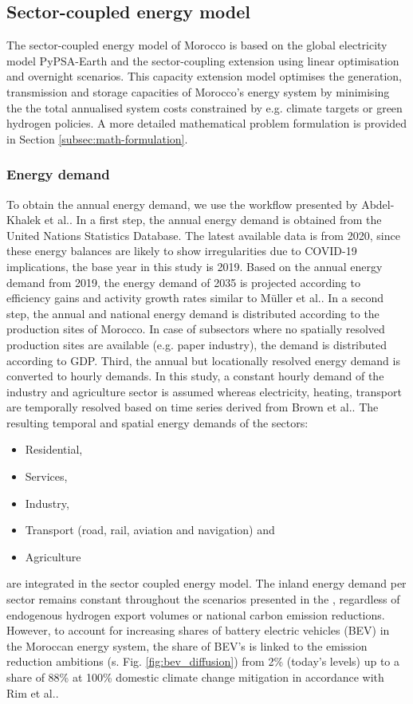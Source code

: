 \subsection*{Sector-coupled energy model}
\label{subsec:moroccan_model}
The sector-coupled energy model of Morocco is based on the global electricity model  PyPSA-Earth \cite{Parzen2023} and the sector-coupling extension \cite{Abdel-Khalek2024} using linear optimisation and overnight scenarios. This capacity extension model optimises the generation, transmission and storage capacities of Morocco's energy system by minimising the the total annualised system costs constrained by e.g. climate targets or green hydrogen policies.
A more detailed mathematical problem formulation is provided in Section \ref{subsec:math-formulation}.


\subsubsection*{Energy demand}
To obtain the annual energy demand, we use the workflow presented by Abdel-Khalek et al.\cite{Abdel-Khalek2024}. In a first step, the annual energy demand is obtained from the United Nations Statistics Database\cite{unstats2023}. The latest available data is from 2020, since these energy balances are likely to show irregularities due to COVID-19 implications, the base year in this study is 2019. Based on the annual energy demand from 2019, the energy demand of 2035 is projected according to efficiency gains and activity growth rates similar to M{\"u}ller et al.\cite{Muller2023}.
In a second step, the annual and national energy demand is distributed according to the production sites of Morocco.
In case of subsectors where no spatially resolved production sites are available (e.g. paper industry), the demand is distributed according to GDP.
Third, the annual but locationally resolved energy demand is converted to hourly demands. In this study, a constant hourly demand of the industry and agriculture sector is assumed whereas electricity, heating, transport are temporally resolved based on time series derived from Brown et al.\cite{Brown2018a}. The resulting temporal and spatial energy demands of the sectors:
\begin{itemize}
    \item Residential,
    \item Services,
    \item Industry,
    \item Transport (road, rail, aviation and navigation) and
    \item Agriculture
\end{itemize}
are integrated in the sector coupled energy model. The inland energy demand per sector remains constant throughout the scenarios presented in the , regardless of endogenous hydrogen export volumes or national carbon emission reductions. However, to account for increasing shares of battery electric vehicles (BEV) in the Moroccan energy system, the share of BEV's is linked to the emission reduction ambitions (s. Fig. \ref{fig:bev_diffusion}) from 2\% (today's levels) up to a share of 88\% at 100\% domestic climate change mitigation in accordance with Rim et al.\cite{Rim2021}.


